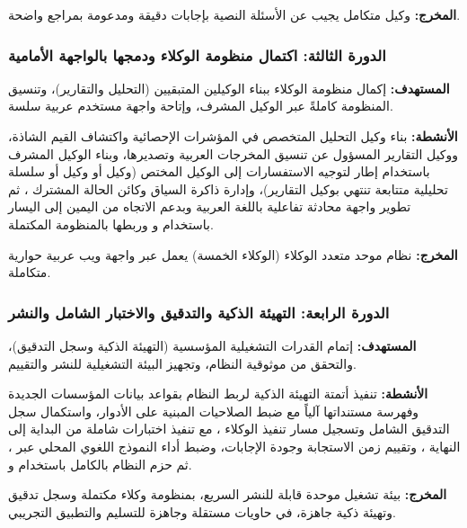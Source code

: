 \textbf{المخرج:} وكيل  متكامل يجيب عن الأسئلة النصية بإجابات دقيقة
ومدعومة بمراجع واضحة.

\subsubsection{الدورة الثالثة: اكتمال منظومة الوكلاء ودمجها بالواجهة الأمامية}
\label{subsubsec:sprint-three}

\textbf{المستهدف:} إكمال منظومة الوكلاء ببناء الوكيلين المتبقيين (التحليل والتقارير)،
وتنسيق المنظومة كاملةً عبر الوكيل المشرف، وإتاحة واجهة مستخدم عربية سلسة.

\textbf{الأنشطة:} بناء وكيل التحليل  المتخصص في المؤشرات
الإحصائية واكتشاف القيم الشاذة، ووكيل التقارير  المسؤول عن
تنسيق المخرجات العربية وتصديرها، وبناء الوكيل المشرف 
باستخدام إطار  لتوجيه الاستفسارات  إلى
الوكيل المختص (وكيل  أو وكيل  أو سلسلة تحليلية متتابعة
تنتهي بوكيل التقارير)، وإدارة ذاكرة السياق  وكائن
الحالة المشترك ، ثم تطوير واجهة محادثة تفاعلية باللغة
العربية وبدعم الاتجاه من اليمين إلى اليسار  باستخدام 
و وربطها بالمنظومة المكتملة.

\textbf{المخرج:} نظام موحد متعدد الوكلاء (الوكلاء الخمسة) يعمل عبر واجهة ويب
عربية حوارية متكاملة.

\subsubsection{الدورة الرابعة: التهيئة الذكية والتدقيق والاختبار الشامل والنشر}
\label{subsubsec:sprint-four}

\textbf{المستهدف:} إتمام القدرات التشغيلية المؤسسية (التهيئة الذكية وسجل
التدقيق)، والتحقق من موثوقية النظام، وتجهيز البيئة التشغيلية للنشر والتقييم.

\textbf{الأنشطة:} تنفيذ أتمتة التهيئة الذكية  لربط
النظام بقواعد بيانات المؤسسات الجديدة وفهرسة مستنداتها آلياً مع ضبط الصلاحيات
المبنية على الأدوار، واستكمال سجل التدقيق الشامل  وتسجيل
مسار تنفيذ الوكلاء ، مع تنفيذ اختبارات شاملة من البداية
إلى النهاية ، وتقييم زمن الاستجابة وجودة الإجابات،
وضبط أداء النموذج اللغوي المحلي  عبر ، ثم
حزم النظام بالكامل باستخدام  و.

\textbf{المخرج:} بيئة تشغيل موحدة قابلة للنشر السريع، بمنظومة وكلاء مكتملة
وسجل تدقيق وتهيئة ذكية جاهزة، في حاويات مستقلة وجاهزة للتسليم والتطبيق
التجريبي.

